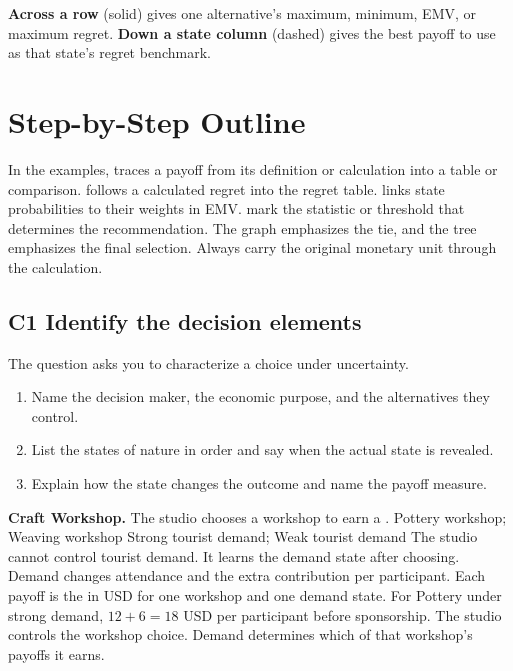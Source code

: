 {\medskip
\noindent
\begin{minipage}{0.24\linewidth}
\centering
{}
\end{minipage}\hfill
\begin{minipage}{0.73\linewidth}
\textbf{Across a row} (solid) gives one alternative's maximum, minimum, EMV, or maximum regret.
\textbf{Down a state column} (dashed) gives the best payoff to use as that state's regret benchmark.
\end{minipage}
}
\par\nobreak
\secInicio

\clearpage
\section{Step-by-Step Outline}
In the examples,  traces a payoff from its definition or calculation into a table or comparison.  follows a calculated regret into the regret table.  links state probabilities to their weights in EMV.  mark the statistic or threshold that determines the recommendation. The graph emphasizes the tie, and the tree emphasizes the final selection. Always carry the original monetary unit through the calculation.

\subsection{C1 \textemdash{} Identify the decision elements}\label{crit:1}
\Cue The question asks you to characterize a choice under uncertainty.
\begin{enumerate}
  \item Name the decision maker, the economic purpose, and the alternatives they control.
  \item List the states of nature in order and say when the actual state is revealed.
  \item Explain how the state changes the outcome and name the payoff measure.
\end{enumerate}
\textbf{Craft Workshop.} The studio chooses a workshop to earn a .
\DecisionElementsTable
  {Pottery workshop; Weaving workshop}
  {Strong tourist demand; Weak tourist demand}
  {The studio cannot control tourist demand. It learns the demand state after choosing.}
  {Demand changes attendance and the extra contribution per participant. Each payoff is the  in USD for one workshop and one demand state.}
For Pottery under strong demand, \(12+6=18\) USD per participant before sponsorship. The studio controls the workshop choice. Demand determines which of that workshop's payoffs it earns.
\par\nobreak
{}

